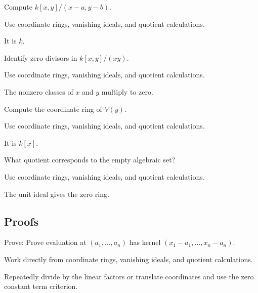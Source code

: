 \begin{exercise}\label{exr:vi03-expand-02}
Compute $k[x,y]/(x-a,y-b)$.
\end{exercise}
\begin{hint}
Use coordinate rings, vanishing ideals, and quotient calculations.
\end{hint}
\begin{solution}
It is $k$.
\end{solution}

\begin{exercise}\label{exr:vi03-expand-03}
Identify zero divisors in $k[x,y]/(xy)$.
\end{exercise}
\begin{hint}
Use coordinate rings, vanishing ideals, and quotient calculations.
\end{hint}
\begin{solution}
The nonzero classes of $x$ and $y$ multiply to zero.
\end{solution}

\begin{exercise}[Line]\label{exr:vi03-expand-04}
Compute the coordinate ring of $V(y)$.
\end{exercise}
\begin{hint}
Use coordinate rings, vanishing ideals, and quotient calculations.
\end{hint}
\begin{solution}
It is $k[x]$.
\end{solution}

\begin{exercise}\label{exr:vi03-expand-05}
What quotient corresponds to the empty algebraic set?
\end{exercise}
\begin{hint}
Use coordinate rings, vanishing ideals, and quotient calculations.
\end{hint}
\begin{solution}
The unit ideal gives the zero ring.
\end{solution}

\subsection*{Proofs}

\begin{exercise}\label{exr:vi03-expand-06}
Prove: Prove evaluation at $(a_1,\ldots,a_n)$ has kernel $(x_1-a_1,\ldots,x_n-a_n)$.
\end{exercise}
\begin{hint}
Work directly from coordinate rings, vanishing ideals, and quotient calculations.
\end{hint}
\begin{solution}
Repeatedly divide by the linear factors or translate coordinates and use the zero constant term criterion.
\end{solution}

